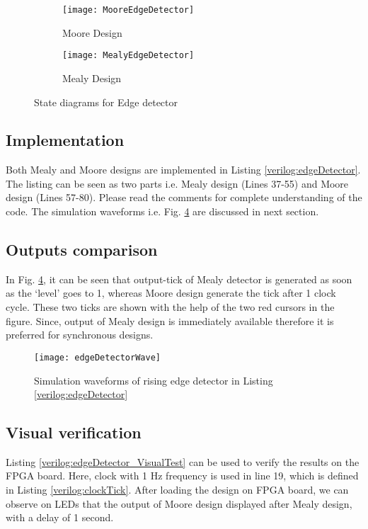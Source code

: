 \begin{figure}[h!]
	\centering
	\begin{subfigure}[!t]{0.45\textwidth}
		\centering
		\texttt{[image: MooreEdgeDetector]}
		\caption{Moore Design}
		\label{fig:MooreEdgeDetector}
	\end{subfigure}
	\begin{subfigure}[!t]{0.45\textwidth}
		\centering
		\texttt{[image: MealyEdgeDetector]}
		\caption{Mealy Design}
		\label{fig:MealyEdgeDetector}
	\end{subfigure}%
	\caption{State diagrams for Edge detector }
	\label{fig:MealyMooreDect}
\end{figure}

\subsection{Implementation}
Both Mealy and Moore designs are implemented in Listing \ref{verilog:edgeDetector}. The listing can be seen as two parts i.e. Mealy design (Lines 37-55) and Moore design (Lines 57-80). Please read the comments for complete understanding of the code. The simulation waveforms i.e. Fig. \ref{fig:edgeDetectorWave} are discussed in next section. 


\subsection{Outputs comparison}

In Fig. \ref{fig:edgeDetectorWave}, it can be seen that output-tick of Mealy detector is generated as soon as the `level' goes to 1, whereas Moore design generate the tick after 1 clock cycle. These two ticks are shown with the help of the two red cursors in the figure. Since, output of Mealy design is immediately available therefore it is preferred for synchronous designs. 

\begin{figure}[!h]
	\centering
	\texttt{[image: edgeDetectorWave]}
	\caption{Simulation waveforms of rising edge detector in Listing \ref{verilog:edgeDetector}}
	\label{fig:edgeDetectorWave}
\end{figure}

\subsection{Visual verification}
Listing \ref{verilog:edgeDetector_VisualTest} can be used to verify the results on the FPGA board. Here, clock with 1 Hz frequency is used in line 19, which is defined in Listing \ref{verilog:clockTick}. After loading the design on FPGA board, we can observe on LEDs that the output of Moore design displayed after  Mealy design, with a delay of 1 second.  

